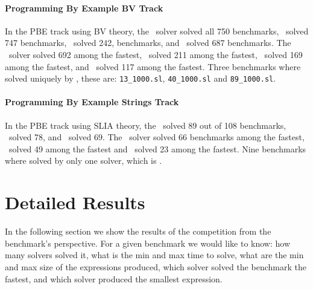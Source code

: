 \paragraph{Programming By Example BV Track}
In the PBE track using BV theory, the \ethree\ solver solved all 750 benchmarks, \euphony\ solved 747 benchmarks, \eusolvernew\ solved 242, benchmarks, and \cvcnew\ solved 687 benchmarks. The \ethree\ solver solved 692 among the fastest, \eusolvernew\ solved 211 among the fastest, \cvcnew\ solved 169 among the fastest, and \euphony\ solved 117 among the fastest. Three benchmarks where solved uniquely by \ethree, these are: \texttt{13_1000.sl}, \texttt{40_1000.sl} and \texttt{89_1000.sl}.

\paragraph{Programming By Example Strings Track}
In the PBE track using SLIA theory, the \cvcnew\ solved 89 out of 108 benchmarks, \euphony\ solved 78, and \eusolvernew\ solved 69. The \euphony\ solver solved 66 benchmarks among the fastest, \cvcnew\ solved 49 among the fastest and \eusolvernew\ solved 23 among the fastest. Nine benchmarks where solved by only one solver, which is \cvcnew.



\section{Detailed Results}
\label{sec:benchs-pres}
In the following section we show the results of the competition from the benchmark's perspective. 
For a given benchmark we would like to know: how many solvers solved it, what is the min and max time to solve,  what are the min and max size of the expressions produced, which solver solved the benchmark the fastest, and which solver produced the smallest expression.



